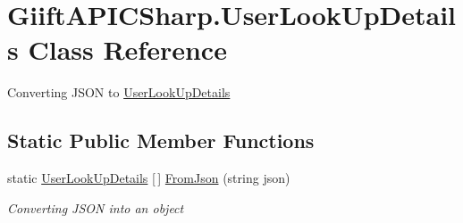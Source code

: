 \hypertarget{class_giift_a_p_i_c_sharp_1_1_user_look_up_details}{}\section{Giift\+A\+P\+I\+C\+Sharp.\+User\+Look\+Up\+Details Class Reference}
\label{class_giift_a_p_i_c_sharp_1_1_user_look_up_details}


Converting J\+S\+ON to \hyperlink{class_giift_a_p_i_c_sharp_1_1_user_look_up_details}{User\+Look\+Up\+Details}  


\subsection*{Static Public Member Functions}
\begin{DoxyCompactItemize}
\item 
static \hyperlink{class_giift_a_p_i_c_sharp_1_1_user_look_up_details}{User\+Look\+Up\+Details} \mbox{[}$\,$\mbox{]} \hyperlink{class_giift_a_p_i_c_sharp_1_1_user_look_up_details_a0c7b1fdbdf0f59bdc6e2743ec1994219}{From\+Json} (string json)
\begin{DoxyCompactList}\small\item\em Converting J\+S\+ON into an object \end{DoxyCompactList}\end{DoxyCompactItemize}
